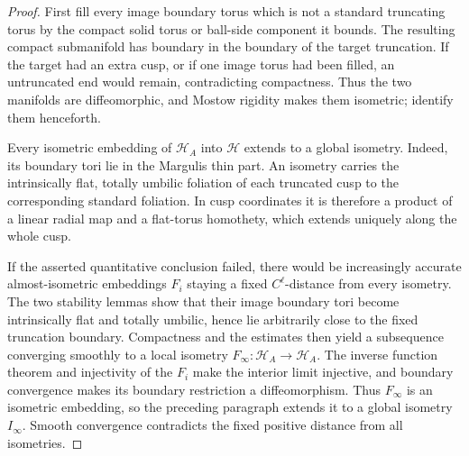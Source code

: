 \begin{proof}
First fill every image boundary torus which is not a standard truncating torus
by the compact solid torus or ball-side component it bounds.  The resulting
compact submanifold has boundary in the boundary of the target truncation.  If
the target had an extra cusp, or if one image torus had been filled, an
untruncated end would remain, contradicting compactness.  Thus the two
manifolds are diffeomorphic, and Mostow rigidity makes them isometric; identify
them henceforth.

Every isometric embedding of \(\mathcal H_A\) into \(\mathcal H\) extends to a
global isometry.  Indeed, its boundary tori lie in the Margulis thin part.
An isometry carries the intrinsically flat, totally umbilic foliation of each
truncated cusp to the corresponding standard foliation.  In cusp coordinates
it is therefore a product of a linear radial map and a flat-torus homothety,
which extends uniquely along the whole cusp.

If the asserted quantitative conclusion failed, there would be increasingly
accurate almost-isometric embeddings \(F_i\) staying a fixed \(C^\ell\)-distance
from every isometry.  The two stability lemmas show that their image boundary
tori become intrinsically flat and totally umbilic, hence lie arbitrarily close
to the fixed truncation boundary.  Compactness and the estimates then yield a
subsequence converging smoothly to a local isometry
\(F_\infty:\mathcal H_A\to\mathcal H_A\).  The inverse function theorem and
injectivity of the \(F_i\) make the interior limit injective, and boundary
convergence makes its boundary restriction a diffeomorphism.  Thus
\(F_\infty\) is an isometric embedding, so the preceding paragraph extends it
to a global isometry \(I_\infty\).  Smooth convergence contradicts the fixed
positive distance from all isometries.
\end{proof}
